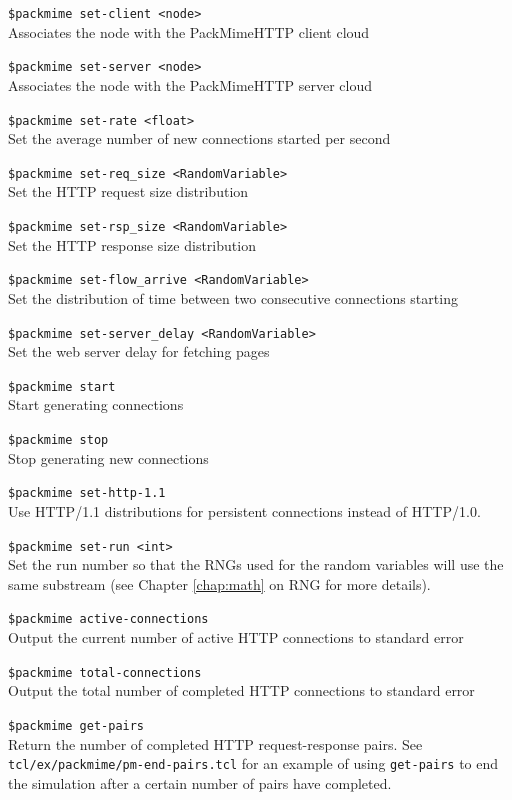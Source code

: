 {\tt \$packmime set-client <node>}\\
Associates the node with the PackMimeHTTP client cloud 

{\tt \$packmime set-server <node>}\\
Associates the node with the PackMimeHTTP server cloud 

{\tt \$packmime set-rate <float>}\\
Set the average number of new connections started per second 

{\tt \$packmime set-req\_size <RandomVariable>}\\
Set the HTTP request size distribution 

{\tt \$packmime set-rsp\_size <RandomVariable>}\\
Set the HTTP response size distribution 

{\tt \$packmime set-flow\_arrive <RandomVariable>}\\
Set the distribution of time between two consecutive connections starting

{\tt \$packmime set-server\_delay <RandomVariable>}\\
Set the web server delay for fetching pages 

{\tt \$packmime start}\\
Start generating connections

{\tt \$packmime stop}\\
Stop generating new connections

{\tt \$packmime set-http-1.1}\\
Use HTTP/1.1 distributions for persistent connections instead of HTTP/1.0.

{\tt \$packmime set-run <int>}\\
Set the run number so that the RNGs used for the random variables will
use the same substream (see Chapter \ref{chap:math} on RNG for more details).

{\tt \$packmime active-connections}\\
Output the current number of active HTTP connections to standard error 

{\tt \$packmime total-connections}\\
Output the total number of completed HTTP connections to standard
error

{\tt \$packmime get-pairs}\\
Return the number of completed HTTP request-response pairs.  See 
{\tt tcl/ex/packmime/pm-end-pairs.tcl} for an example of using
{\tt get-pairs} to end the simulation after a certain number of
pairs have completed.

